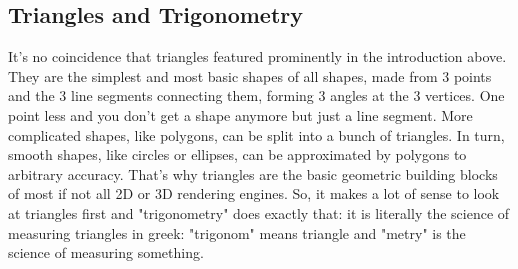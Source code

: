 
\begin{comment}

https://www.mathplanet.com/education/geometry/perpendicular-and-parallel/angles-parallel-lines-and-transversals

https://thirdspacelearning.com/gcse-maths/geometry-and-measure/angles-in-parallel-lines/

https://thirdspacelearning.com/gcse-maths/geometry-and-measure/angle-rules/

https://thirdspacelearning.com/gcse-maths/geometry-and-measure/alternate-angles/
https://thirdspacelearning.com/gcse-maths/geometry-and-measure/corresponding-angles/

https://thirdspacelearning.com/gcse-maths/geometry-and-measure/supplementary-angles/ aka adjacent?

https://thirdspacelearning.com/gcse-maths/geometry-and-measure/co-interior-angles/ aka neighbor?

https://thirdspacelearning.com/gcse-maths/geometry-and-measure/vertically-opposite-angles/ aka opposite


https://thirdspacelearning.com/gcse-maths/geometry-and-measure/types-of-angles/


https://www.cuemath.com/geometry/alternate-interior-angles/
https://www.cuemath.com/geometry/alternate-exterior-angles/

https://www.mathsisfun.com/geometry/parallel-lines.html
https://www.mathsisfun.com/geometry/consecutive-interior-angles.html
https://www.mathsisfun.com/geometry/alternate-interior-angles.html
https://www.mathsisfun.com/geometry/alternate-exterior-angles.html


\end{comment}


\subsection{Triangles and Trigonometry}
It's no coincidence that triangles featured prominently in the introduction above. They are the simplest and most basic shapes of all shapes, made from 3 points and the 3 line segments connecting them, forming 3 angles at the 3 vertices. One point less and you don't get a shape anymore but just a line segment. More complicated shapes, like polygons, can be split into a bunch of triangles. In turn, smooth shapes, like circles or ellipses, can be approximated by polygons to arbitrary accuracy. That's why triangles are the basic geometric building blocks of most if not all 2D or 3D rendering engines. So, it makes a lot of sense to look at triangles first and "trigonometry" does exactly that: it is literally the science of measuring triangles in greek: "trigonom" means triangle and "metry" is the science of measuring something.

